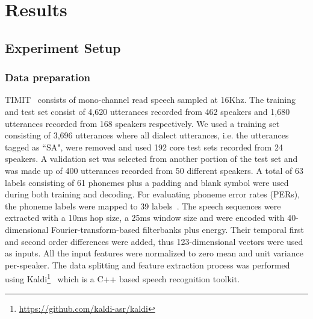 \documentclass[review]{elsarticle}
\begin{document}
\section{Results}
\subsection{Experiment Setup}

\subsubsection{Data preparation}
TIMIT~\citep{timit} consists of mono-channel read speech sampled at 16Khz.
The training and test set consist of 4,620 utterances recorded from 462 speakers and 1,680 utterances recorded from 168 speakers respectively.
We used a training set consisting of 3,696 utterances where all dialect utterances, i.e. the utterances tagged as ``SA", were removed and used 192 core test sets recorded from 24 speakers.
A validation set was selected from another portion of the test set and was made up of 400 utterances recorded from 50 different speakers.
A total of 63 labels consisting of 61 phonemes plus a padding and blank symbol were used during both training and decoding.
For evaluating phoneme error rates (PERs), the phoneme labels were mapped to 39 labels~\citep{DBLP:journals/tsp/LeeH89}.
The speech sequences were extracted with a 10ms hop size, a 25ms window size and were encoded with 40-dimensional Fourier-transform-based filterbanks plus energy. Their temporal first and second order differences were added, thus 123-dimensional vectors were used as inputs.
All the input features were normalized to zero mean and unit variance per-speaker.
The data splitting and feature extraction process was performed using Kaldi\footnote{\url{https://github.com/kaldi-asr/kaldi}}~\citep{Povey2011TheKS} which is a C++ based speech recognition toolkit.
\end{document}
